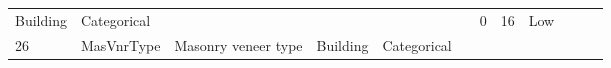 \documentclass[11pt]{article}
\begin{document}
\begin{longtable}[]{@{}llllllllllll@{}}
\begin{minipage}[t]{0.04\columnwidth}
Building\strut
\end{minipage} & \begin{minipage}[t]{0.04\columnwidth}\raggedright\strut
Categorical\strut
\end{minipage} & \begin{minipage}[t]{0.04\columnwidth}\raggedright\strut
\strut
\end{minipage} & \begin{minipage}[t]{0.04\columnwidth}\raggedright\strut
\strut
\end{minipage} & \begin{minipage}[t]{0.04\columnwidth}\raggedright\strut
\strut
\end{minipage} & \begin{minipage}[t]{0.04\columnwidth}\raggedright\strut
\strut
\end{minipage} & \begin{minipage}[t]{0.04\columnwidth}\raggedright\strut
0\strut
\end{minipage} & \begin{minipage}[t]{0.04\columnwidth}\raggedright\strut
16\strut
\end{minipage} & \begin{minipage}[t]{0.04\columnwidth}\raggedright\strut
Low\strut
\end{minipage}\tabularnewline
\begin{minipage}[t]{0.04\columnwidth}\raggedright\strut
26\strut
\end{minipage} & \begin{minipage}[t]{0.04\columnwidth}\raggedright\strut
MasVnrType\strut
\end{minipage} & \begin{minipage}[t]{0.04\columnwidth}\raggedright\strut
Masonry veneer type\strut
\end{minipage} & \begin{minipage}[t]{0.04\columnwidth}\raggedright\strut
Building\strut
\end{minipage} & \begin{minipage}[t]{0.04\columnwidth}\raggedright\strut
Categorical\strut
\end{minipage} & \begin{minipage}[t]{0.04\columnwidth}\raggedright\strut
\strut
\end{minipage} & \begin{minipage}[t]{0.04\columnwidth}\raggedright\strut
\strut
\end{minipage} & \begin{minipage}[t]{0.04\columnwidth}\raggedright\strut

\end{minipage}
\end{longtable}
\end{document}
